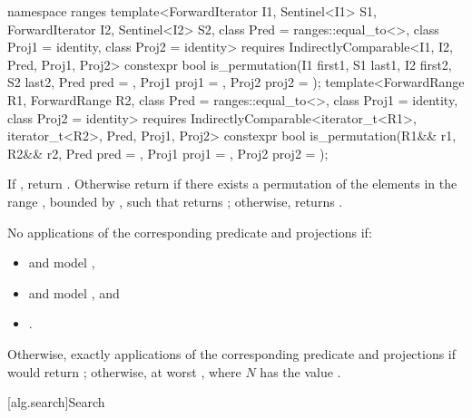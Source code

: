 %
\begin{itemdecl}
namespace ranges {
  template<ForwardIterator I1, Sentinel<I1> S1, ForwardIterator I2,
           Sentinel<I2> S2, class Pred = ranges::equal_to<>, class Proj1 = identity,
           class Proj2 = identity>
    requires IndirectlyComparable<I1, I2, Pred, Proj1, Proj2>
    constexpr bool is_permutation(I1 first1, S1 last1, I2 first2, S2 last2,
                                  Pred pred = {},
                                  Proj1 proj1 = {}, Proj2 proj2 = {});
  template<ForwardRange R1, ForwardRange R2, class Pred = ranges::equal_to<>,
           class Proj1 = identity, class Proj2 = identity>
    requires IndirectlyComparable<iterator_t<R1>, iterator_t<R2>, Pred, Proj1, Proj2>
    constexpr bool is_permutation(R1&& r1, R2&& r2, Pred pred = {},
                                  Proj1 proj1 = {}, Proj2 proj2 = {});
}
\end{itemdecl}

\begin{itemdescr}
\pnum
\returns
If , return .
Otherwise return  if there exists a permutation of the elements
in the range , bounded by ,
such that
returns ;
otherwise, returns .

\pnum
\complexity
No applications of the corresponding predicate and projections if:
\begin{itemize}
\item {} and  model ,
\item {} and  model , and
\item {}.
\end{itemize}
Otherwise, exactly  applications
of the corresponding predicate and projections
if 
would return ;
otherwise, at worst , where $N$ has the value .
\end{itemdescr}

[alg.search]{Search}

